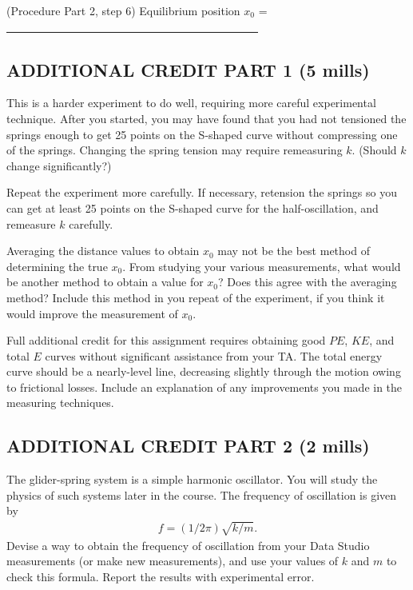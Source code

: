 \item (Procedure Part 2, step 6) Equilibrium position \(x_0\) = \ul{~~~~~~~~~~~~~~~~~~~~~~~~~~~~~~~~~~~~~~~~~~~~~}

\squishend

\subsection*{ADDITIONAL CREDIT PART 1 (5 mills)}

This is a harder experiment to do well, requiring more careful experimental technique.  After you started, you may have found that you had not tensioned the springs enough to get 25 points on the S-shaped curve without compressing one of the springs.  Changing the spring tension may require remeasuring \(k\).  (Should \(k\) change significantly?)

Repeat the experiment more carefully.  If necessary, retension the springs so you can get at least 25 points on the S-shaped curve for the half-oscillation, and remeasure \(k\) carefully.

Averaging the distance values to obtain \(x_0\) may not be the best method of determining the true \(x_0\).  From studying your various measurements, what would be another method to obtain a value for \(x_0\)?  Does this agree with the averaging method?  Include this method in you repeat of the experiment, if you think it would improve the measurement of \(x_0\).

Full additional credit for this assignment requires obtaining good \(PE\), \(KE\), and total \(E\) curves without significant assistance from your TA.  The total energy curve should be a nearly-level line, decreasing slightly through the motion owing to frictional losses.  Include an explanation of any improvements you made in the measuring techniques.

\subsection*{ADDITIONAL CREDIT PART 2 (2 mills)}

The glider-spring system is a simple harmonic oscillator.  You will study the physics of such systems later in the course.   The frequency of oscillation is given by
\begin{align} f = (1/2\pi)\sqrt{k/m}. \end{align}
Devise a way to obtain the frequency of oscillation from your Data Studio measurements (or make new measurements), and use your values of \(k\) and \(m\) to check this formula.  Report the results with experimental error.
